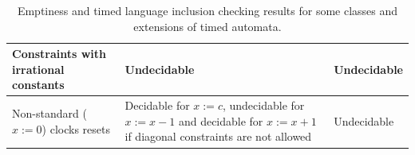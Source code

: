 \begin{table}[htbp]
\begin{tabular}{|p{5cm}|p{4.5cm}|p{2.5cm}|}
    \hline
    
    Constraints with irrational constants &
    Undecidable \cite{Miller00} &
    Undecidable \\

    \hline

    Non-standard ($x := 0$) clocks resets &
    Decidable for $x := c$, undecidable for $x := x -1$ and decidable for $x := x + 1$ if diagonal constraints are not allowed \cite{BDFP04} &
    Undecidable \\
    
    \hline

\end{tabular}
\caption{Emptiness and timed language inclusion checking results for some classes and extensions of timed automata.}
\label{tab:ta-classes-decidability}
\end{table}


